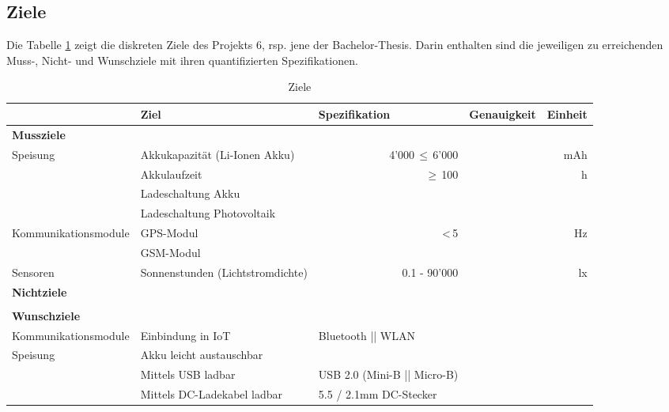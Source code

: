 \begin{landscape}
\subsection{Ziele}
Die Tabelle \ref{tab:ZieleP6} zeigt die diskreten Ziele des Projekts 6, rsp. jene der Bachelor-Thesis. Darin enthalten sind die jeweiligen zu erreichenden Muss-, Nicht- und Wunschziele mit ihren quantifizierten Spezifikationen.\\

\begin{table}[htbp]
  \centering
  \renewcommand{\arraystretch}{1.4}
  \caption{Ziele}
    \begin{tabular}{l|l|l|r|r}
          & \textbf{Ziel} & \multicolumn{1}{l|}{\textbf{Spezifikation}} & \multicolumn{1}{l|}{\textbf{Genauigkeit}} & \multicolumn{1}{l}{\textbf{Einheit}} \\
    \toprule
    \multicolumn{1}{l}{\textbf{Mussziele}} & \multicolumn{4}{r}{} \\
    \toprule
    \multirow{4}{*}{Speisung} & Akkukapazität (Li-Ionen Akku) & \multicolumn{1}{r|}{4'000\,$\leq$\,6'000} &  & mAh \\
\cline{2-5}           & Akkulaufzeit & \multicolumn{1}{r|}{$\geq$\,100} &   & h \\
\cline{2-5}          & Ladeschaltung Akku &       &       &  \\
\cline{2-5}           & Ladeschaltung Photovoltaik &       &       &  \\
    \hline
    \multirow{2}{*}{Kommunikationsmodule} & GPS-Modul   &  \multicolumn{1}{r|}{<\,5}  &       & Hz \\
\cline{2-5}          & GSM-Modul  &       &       &  \\
\hline
Sensoren & Sonnenstunden (Lichtstromdichte) & \multicolumn{1}{r|}{0.1 - 90'000} & & lx \\
    \bottomrule
    \multicolumn{1}{l}{\textbf{Nichtziele}} & \multicolumn{4}{r}{} \\
    \toprule
    & & & & \\
    \bottomrule
    \multicolumn{1}{l}{\textbf{Wunschziele}} & \multicolumn{4}{r}{} \\
    \toprule
    Kommunikationsmodule & Einbindung in IoT &       Bluetooth || WLAN &       &  \\
    \hline
    \multirow{3}{*}{Speisung} & Akku leicht austauschbar &       &       &  \\
\cline{2-5}  & Mittels USB ladbar & USB 2.0 (Mini-B || Micro-B) &       &  \\
\cline{2-5}  & Mittels DC-Ladekabel ladbar &      5.5 / 2.1mm DC-Stecker &       &  \\
    \bottomrule
    \end{tabular}%
  \label{tab:ZieleP6}%
\end{table}%
\end{landscape}
